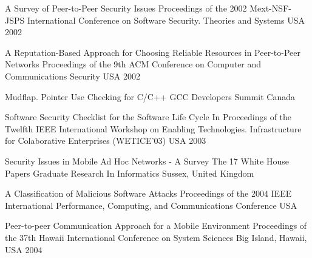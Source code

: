 \begin{thebibliography}{9}
		{}
		{A Survey of Peer-to-Peer Security Issues}
		{Proceedings of the 2002 {M}ext-{NSF}-{JSPS} International Conference on Software Security. Theories and Systems}
		{USA}
		{2002}
	
		{
			\biband
			\biband
			\biband
			\biband
			}
		{A Reputation-Based Approach for Choosing Reliable Resources in Peer-to-Peer Networks}
		{Proceedings of the 9th ACM Conference on Computer and Communications Security}
		{USA}
		{2002}
		
		{}
		{Mudflap. Pointer Use Checking for {C/C++}}
		{{GCC} Developers Summit}
		{Canada}
		{}
	
		{
			\biband
			\biband
			}
		{Software Security Checklist for the Software Life Cycle}
		{In Proceedings of the Twelfth {IEEE} International Workshop on Enabling Technologies. Infrastructure for Colaborative Enterprises ({WETICE}'03)}
		{USA}
		{2003}
	
		{
			\biband
			}
		{Security Issues in Mobile Ad Hoc Networks - A Survey}
		{The 17 White House Papers Graduate Research In Informatics}
		{Sussex, United Kingdom}
		{}
	
		{
			\biband
			}
		{A Classification of Malicious Software Attacks}
		{Proceedings of the 2004 IEEE International Performance, Computing, and Communications Conference}
		{USA}
		{}
	
		{
			\biband
			\biband
			}
		{Peer-to-peer Communication Approach for a Mobile Environment}
		{Proceedings of the 37th {H}awaii International Conference on System Sciences}
		{Big Island, Hawaii, USA}
		{2004}
	

\end{thebibliography}
